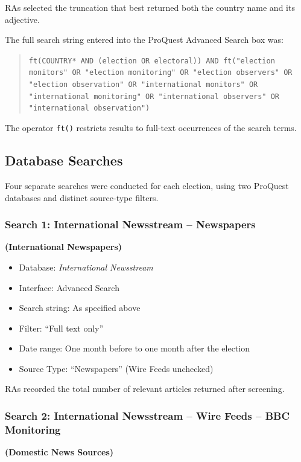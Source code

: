 \documentclass[USletter,12pt, titlepage]{article} %
\begin{document}
RAs selected the truncation that best returned both the country name and its adjective.

The full search string entered into the ProQuest Advanced Search box was:

\begin{quote}
\texttt{ft(COUNTRY* AND (election OR electoral)) AND ft("election monitors" OR "election monitoring" OR "election observers" OR "election observation" OR "international monitors" OR "international monitoring" OR "international observers" OR "international observation")}
\end{quote}

The operator \texttt{ft()} restricts results to full-text occurrences of the search terms.

\subsection{Database Searches}

Four separate searches were conducted for each election, using two ProQuest databases and distinct source-type filters.

\subsubsection{Search 1: International Newsstream -- Newspapers} \textbf{(International Newspapers)}

\begin{itemize}
    \item Database: \textit{International Newsstream}
    \item Interface: Advanced Search
    \item Search string: As specified above
    \item Filter: ``Full text only''
    \item Date range: One month before to one month after the election
    \item Source Type: ``Newspapers'' (Wire Feeds unchecked)
\end{itemize}

RAs recorded the total number of relevant articles returned after screening.

\subsubsection{Search 2: International Newsstream -- Wire Feeds -- BBC Monitoring} \textbf{(Domestic News Sources)}
\end{document}
